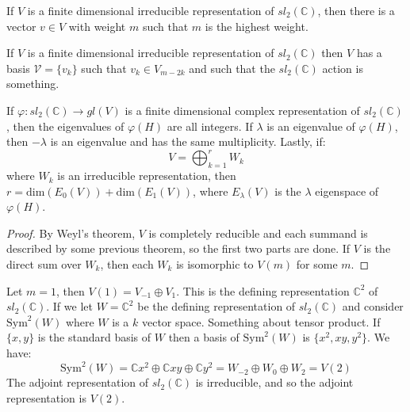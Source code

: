 \documentclass[crop=false,class=article]{standalone}                           %
\begin{document}
        \begin{theorem}
            If $V$ is a finite dimensional irreducible representation of
            $sl_{2}(\mathbb{C})$, then there is a vector $v\in{V}$ with weight
            $m$ such that $m$ is the highest weight.
        \end{theorem}
        \begin{theorem}
            If $V$ is a finite dimensional irreducible representation of
            $sl_{2}(\mathbb{C})$ then $V$ has a basis $\mathcal{V}=\{v_{k}\}$
            such that $v_{k}\in{V}_{m-2k}$ and such that the
            $sl_{2}(\mathbb{C})$ action is something.
        \end{theorem}
        \begin{theorem}
            If $\varphi:sl_{2}(\mathbb{C})\rightarrow{gl}(V)$ is a finite
            dimensional complex representation of $sl_{2}(\mathbb{C})$, then
            the eigenvalues of $\varphi(H)$ are all integers. If $\lambda$ is
            an eigenvalue of $\varphi(H)$, then $\minus\lambda$ is an eigenvalue
            and has the same multiplicity. Lastly, if:
            \begin{equation}
                V=\bigoplus_{k=1}^{r}W_{k}
            \end{equation}
            where $W_{k}$ is an irreducible representation, then
            $r=\textrm{dim}(E_{0}(V))+\textrm{dim}(E_{1}(V))$, where
            $E_{\lambda}(V)$ is the $\lambda$ eigenspace of $\varphi(H)$.
        \end{theorem}
        \begin{proof}
            By Weyl's theorem, $V$ is completely reducible and each summand is
            described by some previous theorem, so the first two parts are done.
            If $V$ is the direct sum over $W_{k}$, then each $W_{k}$ is
            isomorphic to $V(m)$ for some $m$.
        \end{proof}
        Let $m=1$, then $V(1)=V_{\minus{1}}\oplus{V}_{1}$. This is the defining
        representation $\mathbb{C}^{2}$ of $sl_{2}(\mathbb{C})$. If we let
        $W=\mathbb{C}^{2}$ be the defining representation of
        $sl_{2}(\mathbb{C})$ and consider $\textrm{Sym}^{2}(W)$ where $W$ is a
        $k$ vector space. Something about tensor product. If $\{x,y\}$ is the
        standard basis of $W$ then a basis of $\textrm{Sym}^{2}(W)$ is
        $\{x^{2},xy,y^{2}\}$. We have:
        \begin{equation}
            \textrm{Sym}^{2}(W)=
            \mathbb{C}x^{2}\oplus\mathbb{C}xy\oplus\mathbb{C}y^{2}=
            W_{\minus{2}}\oplus{W}_{0}\oplus{W}_{2}=
            V(2)
        \end{equation}
        The adjoint representation of $sl_{2}(\mathbb{C})$ is irreducible, and
        so the adjoint representation is $V(2)$.
\end{document}
